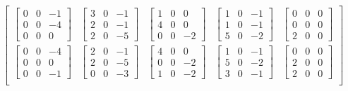 \documentclass{article}
\begin{document}
\[\begin{bmatrix}
    \begin{bmatrix} 0 & 0 & -1 \\ 0 & 0 & -4 \\ 0 & 0 & 0 \end{bmatrix} &
    \begin{bmatrix} 3 & 0 & -1 \\ 2 & 0 & -1 \\ 2 & 0 & -5 \end{bmatrix} &
    \begin{bmatrix} 1 & 0 & 0 \\ 4 & 0 & 0 \\ 0 & 0 & -2 \end{bmatrix} &
    \begin{bmatrix} 1 & 0 & -1 \\ 1 & 0 & -1 \\ 5 & 0 & -2 \end{bmatrix} &
    \begin{bmatrix} 0 & 0 & 0 \\ 0 & 0 & 0 \\ 2 & 0 & 0 \end{bmatrix}   \\

    \begin{bmatrix} 0 & 0 & -4 \\ 0 & 0 & 0 \\ 0 & 0 & -1 \end{bmatrix} &
    \begin{bmatrix} 2 & 0 & -1 \\ 2 & 0 & -5 \\ 0 & 0 & -3 \end{bmatrix} &
    \begin{bmatrix} 4 & 0 & 0 \\ 0 & 0 & -2 \\ 1 & 0 & -2 \end{bmatrix} &
    \begin{bmatrix} 1 & 0 & -1 \\ 5 & 0 & -2 \\ 3 & 0 & -1 \end{bmatrix} &
    \begin{bmatrix} 0 & 0 & 0 \\ 2 & 0 & 0 \\ 2 & 0 & 0 \end{bmatrix}   \\


\end{bmatrix}\]
\end{document}
